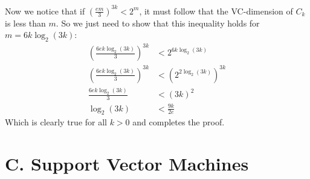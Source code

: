 \documentclass{article}
\begin{document}
\begin{enumerate}
Now we notice that if $\left(\frac{em}{3}\right)^{3k} < 2^m$, it must follow that the VC-dimension of $C_k$ is less than $m$. So we just need to show that this inequality holds for $m = 6k \log_2(3k)$:
\begin{align*}
    \left(\frac{6ek \log_2(3k)}{3}\right)^{3k} &< 2^{6k \log_2(3k)}\\
    \left(\frac{6ek \log_2(3k)}{3}\right)^{3k} &< \left(2^{2\log_2(3k)}\right)^{3k}\\
    \frac{6ek \log_2(3k)}{3} &< (3k)^2\\
    \log_2(3k) &< \frac{9k}{2e}
\end{align*}
Which is clearly true for all $k > 0$ and completes the proof.
\end{enumerate}
\clearpage
\section*{C. Support Vector Machines}
\end{document}
